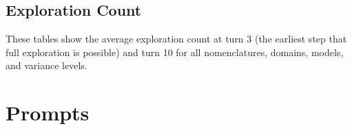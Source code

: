 \documentclass{article} %
\begin{document}
\subsection{Exploration Count}
These tables show the average exploration count at turn 3 (the earliest step that full exploration is possible) and turn 10 for all nomenclatures, domains, models, and variance levels.










%  
%  
%  
%  
%  
%  
%  
%  
%  

\section{Prompts}
\label{app:prompts}


\end{document}
